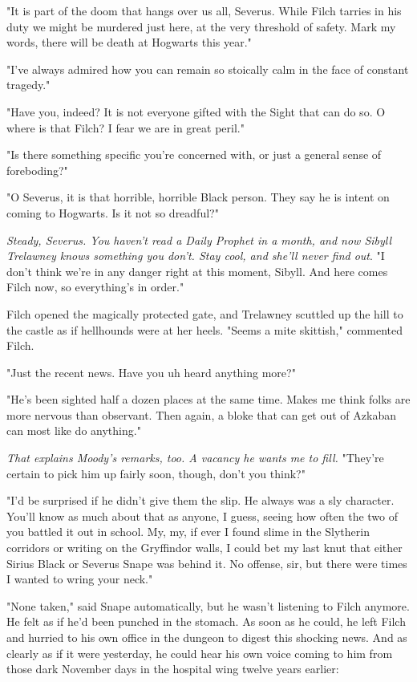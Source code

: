 "It is part of the doom that hangs over us all, Severus. While Filch tarries in his duty we might be murdered just here, at the very threshold of safety. Mark my words, there will be death at Hogwarts this year."

"I've always admired how you can remain so stoically calm in the face of constant tragedy."

"Have you, indeed? It is not everyone gifted with the Sight that can do so. O where is that Filch? I fear we are in great peril."

"Is there something specific you're concerned with, or just a general sense of foreboding?"

"O Severus, it is that horrible, horrible Black person. They say he is intent on coming to Hogwarts. Is it not so dreadful?"

\emph{Steady, Severus. You haven't read a Daily Prophet in a month, and now Sibyll Trelawney knows something you don't. Stay cool, and she'll never find out}. "I don't think we're in any danger right at this moment, Sibyll. And here comes Filch now, so everything's in order."

Filch opened the magically protected gate, and Trelawney scuttled up the hill to the castle as if hellhounds were at her heels. "Seems a mite skittish," commented Filch.

"Just the recent news. Have you{\el} uh{\el} heard anything more?"

"He's been sighted half a dozen places at the same time. Makes me think folks are more nervous than observant. Then again, a bloke that can get out of Azkaban can most like do anything."

\emph{That explains Moody's remarks, too. A vacancy he wants me to fill.} "They're certain to pick him up fairly soon, though, don't you think?"

"I'd be surprised if he didn't give them the slip. He always was a sly character. You'll know as much about that as anyone, I guess, seeing how often the two of you battled it out in school. My, my, if ever I found slime in the Slytherin corridors or writing on the Gryffindor walls, I could bet my last knut that either Sirius Black or Severus Snape was behind it. No offense, sir, but there were times I wanted to wring your neck."

"None taken," said Snape automatically, but he wasn't listening to Filch anymore. He felt as if he'd been punched in the stomach. As soon as he could, he left Filch and hurried to his own office in the dungeon to digest this shocking news. And as clearly as if it were yesterday, he could hear his own voice coming to him from those dark November days in the hospital wing twelve years earlier:

